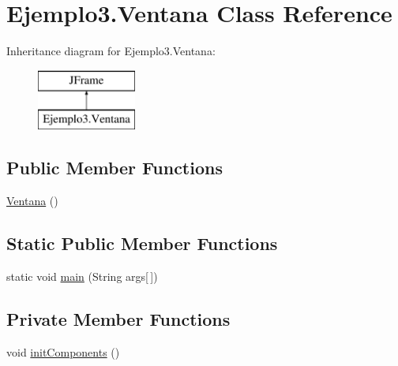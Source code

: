 \hypertarget{class_ejemplo3_1_1_ventana}{}\section{Ejemplo3.\+Ventana Class Reference}
\label{class_ejemplo3_1_1_ventana}
Inheritance diagram for Ejemplo3.\+Ventana\+:\begin{figure}[H]
\begin{center}
\leavevmode
\includegraphics[height=2.000000cm]{class_ejemplo3_1_1_ventana}
\end{center}
\end{figure}
\subsection*{Public Member Functions}
\begin{DoxyCompactItemize}
\item 
\mbox{\hyperlink{class_ejemplo3_1_1_ventana_a3f6d615323f128823ee69f37072074be}{Ventana}} ()
\end{DoxyCompactItemize}
\subsection*{Static Public Member Functions}
\begin{DoxyCompactItemize}
\item 
static void \mbox{\hyperlink{class_ejemplo3_1_1_ventana_a631699b39a0d1b90df30be894781bb0e}{main}} (String args\mbox{[}$\,$\mbox{]})
\end{DoxyCompactItemize}
\subsection*{Private Member Functions}
\begin{DoxyCompactItemize}
\item 
void \mbox{\hyperlink{class_ejemplo3_1_1_ventana_a11ba26ba1137e0103d7bae3b3aa3fec7}{init\+Components}} ()
\end{DoxyCompactItemize}
